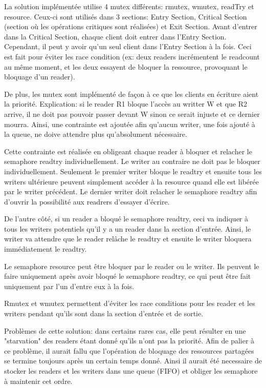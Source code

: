 \documentclass[11pt,a4paper]{article}
\begin{document}
La solution implémentée utilise 4 mutex différents: rmutex, wmutex, readTry et resource. Ceux-ci sont utilisés dans 3 sections: Entry Section, Critical Section (section où les opérations critiques sont réalisées) et Exit Section. Avant d'entrer dans la Critical Section, chaque client doit entrer dans l'Entry Section. Cependant, il peut y avoir qu'un seul client dans l'Entry Section à la fois. Ceci est fait pour éviter les race condition (ex: deux readers incrémentent le readcount au même moment, et les deux essayent de bloquer la ressource, provoquant le bloquage d'un reader).

De plus, les mutex sont implémenté de façon à ce que les clients en écriture aient la priorité. Explication: si le reader R1 bloque l'accès au writter W et que R2 arrive, il ne doit pas pouvoir passer devant W sinon ce serait injuste et ce dernier mourra. Ainsi, une contrainte est ajoutée afin qu'aucun writer, une fois ajouté à la queue, ne doive attendre plus qu'absolument nécessaire. 

Cette contrainte est réalisée en obligeant chaque reader à bloquer et relacher le semaphore readtry individuellement. Le writer au contraire ne doit pas le bloquer individuellement. Seulement le premier writer bloque le readtry et ensuite tous les writers ultérieure peuvent simplement accéder à la resource quand elle est libérée par le writer précédent. Le dernier writer doit relacher le semaphore readtry afin d'ouvrir la possibilité aux readrers d'essayer d'écrire. 

De l'autre côté, si un reader a bloqué le semaphore readtry, ceci va indiquer à tous les writers potentiels qu'il y a un reader dans la section d'entrée. Ainsi, le writer va attendre que le reader relâche le readtry et ensuite le writer bloquera immédiatement le readtry.

Le semaphore resource peut être bloquer par le reader ou le writer. Ils peuvent le faire uniquement après avoir bloqué le semaphore readtry, ce qui peut être fait uniquement par l'un d'entre eux à la fois.

Rmutex et wmutex permettent d'éviter les race conditions pour les reader et les writers pendant qu'ils sont dans la section d'entrée et de sortie.

Problèmes de cette solution: dans certains rares cas, elle peut résulter en une "starvation" des readers étant donné qu'ils n'ont pas la priorité. Afin de palier à ce problème, il aurait fallu que l'opération de bloquage des ressources partagées se termine toujours après un certain temps donné. Ainsi il aurait été necessaire de stocker les readers et les writers dans une queue (FIFO) et obliger les semaphore à maintenir cet ordre.
\end{document}
